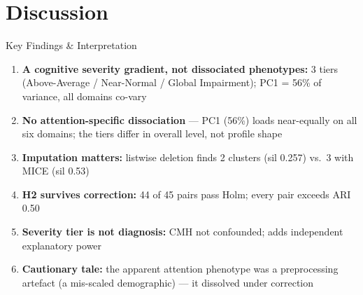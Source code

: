 \documentclass[aspectratio=169, 11pt]{beamer}
\begin{document}
\section{Discussion}

\begin{frame}{Key Findings \& Interpretation}
  \begin{enumerate}
    \item \textbf{A cognitive severity gradient, not dissociated phenotypes:} 3 tiers (Above-Average / Near-Normal / Global Impairment); PC1 = 56\% of variance, all domains co-vary
    \item \textbf{No attention-specific dissociation} --- PC1 (56\%) loads near-equally on all six domains; the tiers differ in overall level, not profile shape
    \item \textbf{Imputation matters:} listwise deletion finds 2 clusters (sil 0.257) vs.\ 3 with MICE (sil 0.53)
    \item \textbf{H2 survives correction:} 44 of 45 pairs pass Holm; every pair exceeds ARI 0.50
    \item \textbf{Severity tier is not diagnosis:} CMH not confounded; adds independent explanatory power
    \item \textbf{Cautionary tale:} the apparent attention phenotype was a preprocessing artefact (a mis-scaled demographic) --- it dissolved under correction
  \end{enumerate}
\end{frame}
\end{document}
